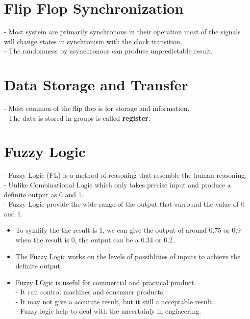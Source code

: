 \documentclass[12pt]{article}
\begin{document}
\section{Flip Flop Synchronization}
- Most system are primarily synchronous in their operation most of the signals will change states in synchronism with the clock transition. \\
- The randomness by asynchronous can produce unpredictable result.
\section{Data Storage and Transfer}
- Most common of the flip flop is for storage and information. \\
- The data is stored in groups is called \textbf{register}. \\
\section{Fuzzy Logic}
- Fuzzy Logic (FL) is a method of reasoning that resemble the human reasoning.\\
- Unlike Combinational Logic which only takes precise input and produce a definite output as 0 and 1. \\
- Fuzzy Logic provide the wide range of the output that surround the value of 0 and 1.\\
\begin{itemize}
	\item To symlify the the result is 1, we can give the output of around 0.75 or 0.9 when the result is 0, the output can be a 0.34 or 0.2.
	\item The Fuzzy Logic works on the levels of possiblities of inputs to achieve the definite output.
	\item Fuzzy LOgic is useful for commercial and practical product. \\
	- It can control machines and consumer products. \\
	- It may not give a accurate result, but it still a acceptable result. \\
	- Fuzzy logic help to deal with the uncertainly in engineering.
\end{itemize}
\end{document}
